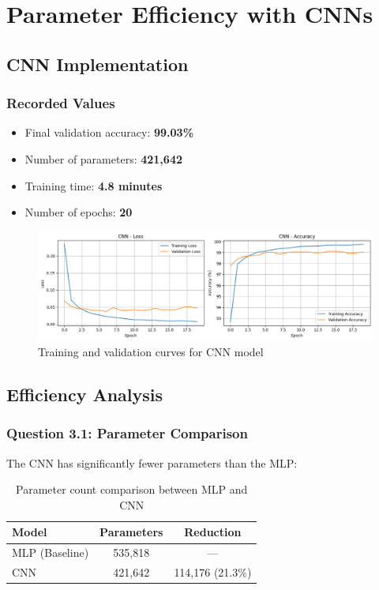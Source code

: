 \section{Parameter Efficiency with CNNs}

\subsection{CNN Implementation}

\subsubsection{Recorded Values}
\begin{itemize}
    \item Final validation accuracy: \textbf{99.03\%}
    \item Number of parameters: \textbf{421,642}
    \item Training time: \textbf{4.8 minutes}
    \item Number of epochs: \textbf{20}
\end{itemize}

\begin{figure}[h]
    \centering
    \includegraphics[width=0.8\linewidth]{section3/cnn.png}
    \caption{Training and validation curves for CNN model}
    \label{fig:cnn}
\end{figure}

\subsection{Efficiency Analysis}

\subsubsection{Question 3.1: Parameter Comparison}

The CNN has significantly fewer parameters than the MLP:

\begin{table}[h]
\centering
\begin{tabular}{|l|c|c|}
\hline
\textbf{Model} & \textbf{Parameters} & \textbf{Reduction} \\ \hline
MLP (Baseline) & 535,818             & ---                \\ \hline
CNN            & 421,642             & 114,176 (21.3\%)   \\ \hline
\end{tabular}
\caption{Parameter count comparison between MLP and CNN}
\label{tab:cnn-parameters}
\end{table}

